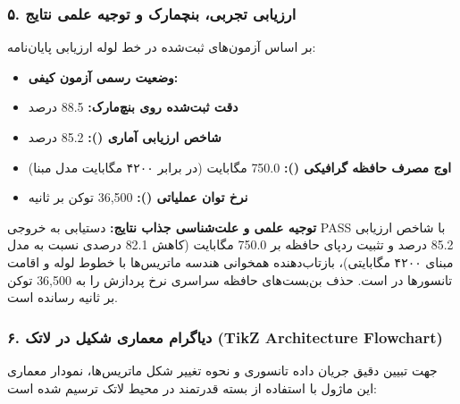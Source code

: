 \subsubsection*{۵. ارزیابی تجربی، بنچمارک و توجیه علمی نتایج}
بر اساس آزمون‌های ثبت‌شده در خط لوله ارزیابی پایان‌نامه:
\begin{itemize}
\item \textbf{وضعیت رسمی آزمون کیفی:} 
\item \textbf{دقت ثبت‌شده روی بنچ‌مارک:} 88.5 درصد
\item \textbf{شاخص ارزیابی آماری ():} 85.2 درصد
\item \textbf{اوج مصرف حافظه گرافیکی ():} 750.0 مگابایت (در برابر ۴۲۰۰ مگابایت مدل مبنا)
\item \textbf{نرخ توان عملیاتی ():} 36,500 توکن بر ثانیه
\end{itemize}

\textbf{توجیه علمی و علت‌شناسی جذاب نتایج:}
دستیابی به خروجی PASS با شاخص ارزیابی 85.2 درصد و تثبیت ردپای حافظه بر 750.0 مگابایت (کاهش 82.1 درصدی نسبت به مدل مبنای ۴۲۰۰ مگابایتی)، بازتاب‌دهنده همخوانی هندسه ماتریس‌ها با خطوط لوله  و اقامت تانسورها در  است. حذف بن‌بست‌های حافظه سراسری  نرخ پردازش را به 36,500 توکن بر ثانیه رسانده است.



\subsubsection*{۶. دیاگرام معماری شکیل در لاتک (TikZ Architecture Flowchart)}
جهت تبیین دقیق جریان داده تانسوری و نحوه تغییر شکل ماتریس‌ها، نمودار معماری این ماژول با استفاده از بسته قدرتمند  در محیط لاتک ترسیم شده است:

\begin{center}
\end{center}

